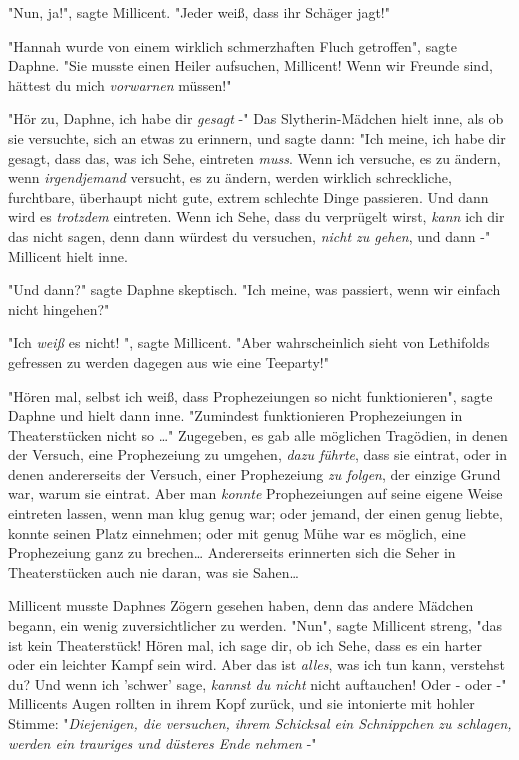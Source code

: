 {"Nun, ja!", sagte Millicent. "Jeder weiß, dass ihr Schäger jagt!"

"Hannah wurde von einem wirklich schmerzhaften Fluch getroffen", sagte Daphne. "Sie musste einen Heiler aufsuchen, Millicent! Wenn wir Freunde sind, hättest du mich \emph{vorwarnen} müssen!"

"Hör zu, Daphne, ich habe dir \emph{gesagt} -" Das Slytherin-Mädchen hielt inne, als ob sie versuchte, sich an etwas zu erinnern, und sagte dann: "Ich meine, ich habe dir gesagt, dass das, was ich Sehe, eintreten \emph{muss}. Wenn ich versuche, es zu ändern, wenn \emph{irgendjemand} versucht, es zu ändern, werden wirklich schreckliche, furchtbare, überhaupt nicht gute, extrem schlechte Dinge passieren. Und dann wird es \emph{trotzdem} eintreten. Wenn ich Sehe, dass du verprügelt wirst, \emph{kann} ich dir das nicht sagen, denn dann würdest du versuchen, \emph{nicht zu gehen}, und dann -" Millicent hielt inne.

"Und dann?" sagte Daphne skeptisch. "Ich meine, was passiert, wenn wir einfach nicht hingehen?"

"Ich \emph{weiß} es nicht! ", sagte Millicent. "Aber wahrscheinlich sieht von Lethifolds gefressen zu werden dagegen aus wie eine Teeparty!"

"Hören mal, selbst ich weiß, dass Prophezeiungen so nicht funktionieren", sagte Daphne und hielt dann inne. "Zumindest funktionieren Prophezeiungen in Theaterstücken nicht so …" Zugegeben, es gab alle möglichen Tragödien, in denen der Versuch, eine Prophezeiung zu umgehen, \emph{dazu führte}, dass sie eintrat, oder in denen andererseits der Versuch, einer Prophezeiung \emph{zu folgen}, der einzige Grund war, warum sie eintrat. Aber man \emph{konnte} Prophezeiungen auf seine eigene Weise eintreten lassen, wenn man klug genug war; oder jemand, der einen genug liebte, konnte seinen Platz einnehmen; oder mit genug Mühe war es möglich, eine Prophezeiung ganz zu brechen… Andererseits erinnerten sich die Seher in Theaterstücken auch nie daran, was sie Sahen…

Millicent musste Daphnes Zögern gesehen haben, denn das andere Mädchen begann, ein wenig zuversichtlicher zu werden. "Nun", sagte Millicent streng, "das ist kein Theaterstück! Hören mal, ich sage dir, ob ich Sehe, dass es ein harter oder ein leichter Kampf sein wird. Aber das ist \emph{alles}, was ich tun kann, verstehst du? Und wenn ich 'schwer' sage, \emph{kannst du nicht} nicht auftauchen! Oder - oder -" Millicents Augen rollten in ihrem Kopf zurück, und sie intonierte mit hohler Stimme: "\emph{Diejenigen, die versuchen, ihrem Schicksal ein Schnippchen zu schlagen, werden ein trauriges und düsteres Ende nehmen} -"

}
